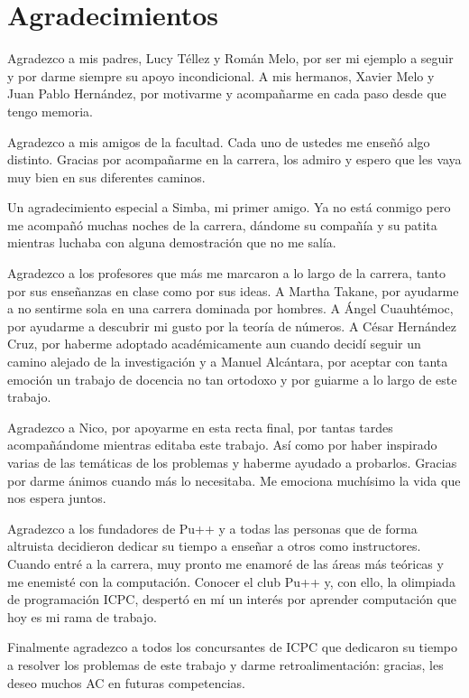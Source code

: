 \chapter*{Agradecimientos}
Agradezco a mis padres, Lucy Téllez y Román Melo, por ser mi ejemplo a seguir y por darme siempre su apoyo incondicional. A mis hermanos, Xavier Melo y Juan Pablo Hernández, por motivarme y acompañarme en cada paso desde que tengo memoria.

Agradezco a mis amigos de la facultad. Cada uno de ustedes me enseñó algo distinto. Gracias por acompañarme en la carrera, los admiro y espero que les vaya muy bien en sus diferentes caminos. 

Un agradecimiento especial a Simba, mi primer amigo. Ya no está conmigo pero me acompañó muchas noches de la carrera, dándome su compañía y su patita mientras luchaba con alguna demostración que no me salía. 

Agradezco a los profesores que más me marcaron a lo largo de la carrera, tanto por sus enseñanzas en clase como por sus ideas. A Martha Takane, por ayudarme a no sentirme sola en una carrera dominada por hombres. A Ángel Cuauhtémoc, por ayudarme a descubrir mi gusto por la teoría de números. A César Hernández Cruz, por haberme adoptado académicamente aun cuando decidí seguir un camino alejado de la investigación y a Manuel Alcántara, por aceptar con tanta emoción un trabajo de docencia no tan ortodoxo y por guiarme a lo largo de este trabajo.

Agradezco a Nico, por apoyarme en esta recta final, por tantas tardes acompañándome mientras editaba este trabajo. Así como por haber inspirado varias de las temáticas de los problemas y haberme ayudado a probarlos. Gracias por darme ánimos cuando más lo necesitaba. Me emociona muchísimo la vida que nos espera juntos.

Agradezco a los fundadores de Pu++ y a todas las personas que de forma altruista decidieron dedicar su tiempo a enseñar a otros como instructores. Cuando entré a la carrera, muy pronto me enamoré de las áreas más teóricas y me enemisté con la computación. Conocer el club Pu++ y, con ello, la olimpiada de programación ICPC, despertó en mí un interés por aprender computación que hoy es mi rama de trabajo.

Finalmente agradezco a todos los concursantes de ICPC que dedicaron su tiempo a resolver los problemas de este trabajo y darme retroalimentación: gracias, les deseo muchos AC en futuras competencias.

